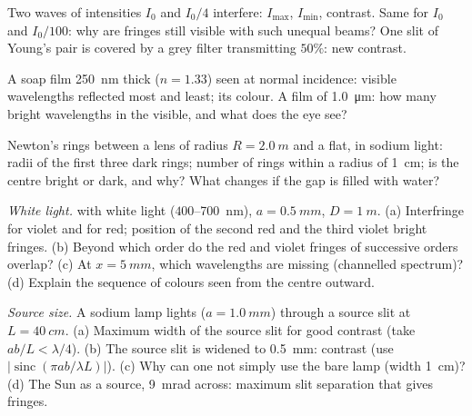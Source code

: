 \begin{exercise}[$\star$]\label{exo:b2:two-wave-interference:2}
Two waves of intensities $I_0$ and $I_0/4$ interfere: $I_{\max}$, $I_{\min}$,
contrast. Same for $I_0$ and $I_0/100$: why are fringes still visible
with such unequal beams? One slit of Young's pair is covered by a
grey filter transmitting $50\%$: new contrast.
\end{exercise}

\begin{exercise}[$\star$]\label{exo:b2:two-wave-interference:3}
A soap film \qty{250}{nm} thick ($n = 1.33$) seen at normal incidence:
visible wavelengths reflected most and least; its colour. A film of
\qty{1.0}{\micro m}: how many bright wavelengths in the visible, and what
does the eye see?
\end{exercise}

\begin{exercise}[$\star$]\label{exo:b2:two-wave-interference:4}
Newton's rings between a lens of radius $R = \qty{2.0}{m}$ and a flat, in
sodium light: radii of the first three dark rings; number of rings
within a radius of \qty{1}{cm}; is the centre bright or dark, and why?
What changes if the gap is filled with water?
\end{exercise}

\begin{exercise}[$\star\star$]\label{exo:b2:two-wave-interference:5}
\emph{White light.}  with white light ($400$--\qty{700}{nm}),
$a = \qty{0.5}{mm}$, $D = \qty{1}{m}$. (a) Interfringe for violet and for red;
position of the second red and the third violet bright fringes. (b)
Beyond which order do the red and violet fringes of successive orders
overlap? (c) At $x = \qty{5}{mm}$, which wavelengths are missing
(channelled spectrum)? (d) Explain the sequence of colours seen from
the centre outward.
\end{exercise}

\begin{exercise}[$\star\star$]\label{exo:b2:two-wave-interference:6}
\emph{Source size.} A sodium lamp lights  ($a = \qty{1.0}{mm}$)
through a source slit at $L = \qty{40}{cm}$. (a) Maximum width of the
source slit for good contrast (take $ab/L < \lambda/4$). (b) The source slit
is widened to \qty{0.5}{mm}: contrast (use $|\operatorname{sinc}(\pi ab/\lambda L)|$).
(c) Why can one not simply use the bare lamp (width \qty{1}{cm})? (d) The
Sun as a source, \qty{9}{mrad} across: maximum slit separation that
gives fringes.
\end{exercise}

